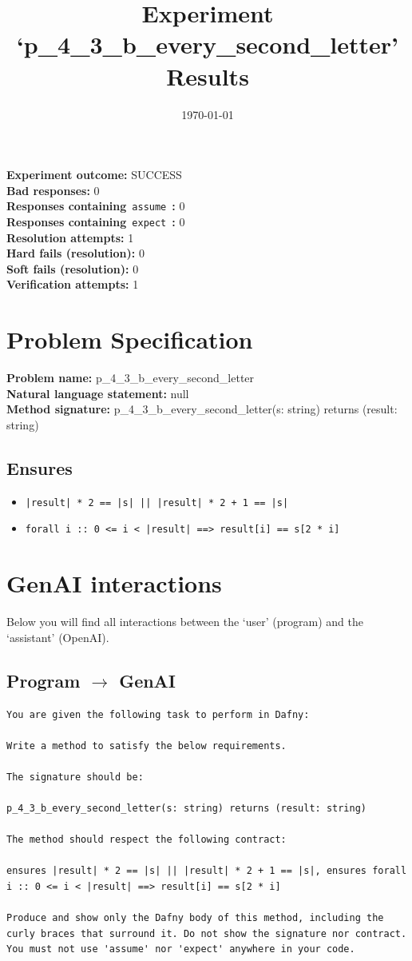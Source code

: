 \documentclass{article}
\begin{document}
\title{Experiment `p\_4\_3\_b\_every\_second\_letter' Results}
\author{\today}
\date{}
\maketitle
\textbf{Experiment outcome: }SUCCESS
\\\textbf{Bad responses: }0
\\\textbf{Responses containing}~\texttt{assume}~\textbf{: }0
\\\textbf{Responses containing}~\texttt{expect}~\textbf{: }0
\\\textbf{Resolution attempts: }1
\\\textbf{Hard fails (resolution): }0
\\\textbf{Soft fails (resolution): }0
\\\textbf{Verification attempts: }1
\section*{Problem Specification}
\textbf{Problem name: }p\_4\_3\_b\_every\_second\_letter
\\\textbf{Natural language statement: }null
\\\textbf{Method signature: }p\_4\_3\_b\_every\_second\_letter(s: string) returns (result: string)
\subsection*{Ensures}
\begin{itemize}
\item \texttt{|result| * 2 == |s| || |result| * 2 + 1 == |s|}
\item \texttt{forall i :: 0 <= i < |result| ==> result[i] == s[2 * i]}
\end{itemize}
\clearpage
\section*{GenAI interactions}
Below you will find all interactions between the `user' (program) and the `assistant' (OpenAI).
\subsection*{Program $\rightarrow$ GenAI}
\begin{lstlisting}
You are given the following task to perform in Dafny:

Write a method to satisfy the below requirements.

The signature should be:

p_4_3_b_every_second_letter(s: string) returns (result: string)

The method should respect the following contract:

ensures |result| * 2 == |s| || |result| * 2 + 1 == |s|, ensures forall i :: 0 <= i < |result| ==> result[i] == s[2 * i]

Produce and show only the Dafny body of this method, including the curly braces that surround it. Do not show the signature nor contract. You must not use 'assume' nor 'expect' anywhere in your code.
\end{lstlisting}
\end{document}

